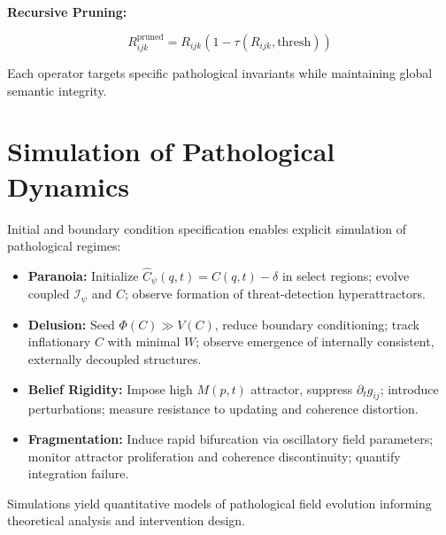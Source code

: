 \textbf{Recursive Pruning:}

\begin{equation}
R_{ijk}^{\text{pruned}} = R_{ijk} (1 - \tau(R_{ijk}, \text{thresh}))
\end{equation}

Each operator targets specific pathological invariants while maintaining global semantic integrity.


\section{Simulation of Pathological Dynamics}
\label{sec:simulation_of_pathological_dynamics}

Initial and boundary condition specification enables explicit simulation of pathological regimes:

\begin{itemize}

    \item \textbf{Paranoia:} Initialize \(\hat{C}_{\psi}(q,t) = C(q,t) - \delta\) in select regions; evolve coupled \(\mathcal{I}_{\psi}\) and \(C\); observe formation of threat-detection hyperattractors.
    
    \item \textbf{Delusion:} Seed \(\Phi(C) \gg V(C)\), reduce boundary conditioning; track inflationary \(C\) with minimal \(W\); observe emergence of internally consistent, externally decoupled structures.
    
    \item \textbf{Belief Rigidity:} Impose high \(M(p,t)\) attractor, suppress \(\partial_t g_{ij}\); introduce perturbations; measure resistance to updating and coherence distortion.
    
    \item \textbf{Fragmentation:} Induce rapid bifurcation via oscillatory field parameters; monitor attractor proliferation and coherence discontinuity; quantify integration failure.

\end{itemize}

Simulations yield quantitative models of pathological field evolution informing theoretical analysis and intervention design.


